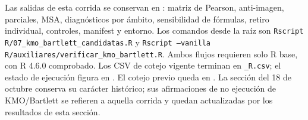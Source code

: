 Las salidas de esta corrida se conservan en : matriz de Pearson, anti-imagen, parciales, MSA, diagnósticos por ámbito, sensibilidad de fórmulas, retiro individual, controles, manifest y entorno. Los comandos desde la raíz son \texttt{Rscript R/07\_kmo\_bartlett\_candidatas.R} y \texttt{Rscript --vanilla R/auxiliares/verificar\_kmo\_bartlett.R}. Ambos flujos requieren solo R base, con R 4.6.0 comprobado. Los CSV de cotejo vigente terminan en \texttt{\_R.csv}; el estado de ejecución figura en . El cotejo previo queda en . La sección del 18 de octubre conserva su carácter histórico; sus afirmaciones de no ejecución de KMO/Bartlett se refieren a aquella corrida y quedan actualizadas por los resultados de esta sección.
